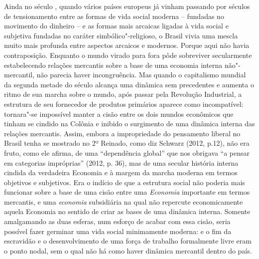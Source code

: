 {Ainda no século , quando vários países europeus já vinham passando
por séculos de tensionamento entre as formas de vida social moderna --
fundadas no movimento do dinheiro -- e as formas mais arcaicas ligadas à
vida social e subjetiva fundadas no caráter simbólico"-religioso, o
Brasil vivia uma mescla muito mais profunda entre aspectos arcaicos e
modernos. Porque aqui não havia contraposição. Enquanto o mundo virado
para fora pôde sobreviver secularmente estabelecendo relações mercantis
sobre a base de uma economia interna não"-mercantil, não parecia haver
incongruência. Mas quando o capitalismo mundial da segunda metade do
século  alcança uma dinâmica sem precedentes e aumenta o ritmo de sua
marcha sobre o mundo, após passar pela Revolução Industrial, a estrutura
de seu fornecedor de produtos primários aparece como incompatível:
tornara"-se impossível manter a cisão entre os dois mundos econômicos que
tinham se cindido na Colônia e inibido o surgimento de uma dinâmica
interna das relações mercantis. Assim, embora a impropriedade do
pensamento liberal no Brasil tenha se mostrado no 2º Reinado, como diz
Schwarz (2012, p.12), não era fruto, como ele afirma, de uma
``dependência global'' que nos obrigava ``a pensar em categorias
impróprias'' (2012, p. 36), mas de uma secular história interna cindida
da verdadeira Economia e à margem da marcha moderna em termos objetivos
e subjetivos. Era o indício de que a estrutura social não poderia mais
funcionar sobre a base de uma cisão entre uma \emph{Economia} importante
em termos mercantis, e uma \emph{economia} subsidiária na qual não
repercute economicamente aquela Economia no sentido de criar as bases de
uma dinâmica interna. Somente amalgamando as duas esferas, num esforço
de acabar com essa cisão, seria possível fazer germinar uma vida social
minimamente moderna: e o fim da escravidão e o desenvolvimento de uma
força de trabalho formalmente livre eram o ponto nodal, sem o qual não
há como haver dinâmica mercantil dentro do país.

}

